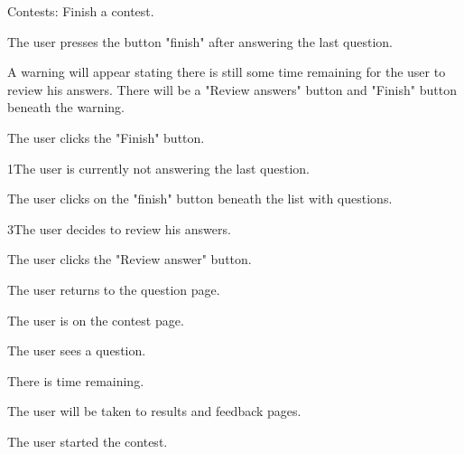 \documentclass[10pt,a4paper]{article}
\begin{document}
\begin{uc}{Contests: Finish a contest.}


    \begin{uc-mss}
    \item The user presses the button "finish" after answering the last question.
    \item A warning will appear stating there is still some time remaining for the user to review his answers. There will be a "Review answers" button and "Finish" button beneath the warning.
    \item The user clicks the "Finish" button.
    \end{uc-mss}

    \begin{uc-ext}

        \begin{uc-fail}{1}{The user is currently not answering the last question.}
        \item The user clicks on the "finish" button beneath the list with questions. 
        \end{uc-fail}

	\begin{uc-fail}{3}{The user decides to review his answers.}
	\item The user clicks the "Review answer" button.
	\item The user returns to the question page. 
	\end{uc-fail}

    \end{uc-ext}

    \begin{uc-pre}
    \item The user is on the contest page.
    \item The user sees a question. 
    \item There is time remaining. 
    \end{uc-pre}

    \begin{uc-post}
    \item The user will be taken to results and feedback pages. 
    \end{uc-post}

    \begin{uc-trig}
    The user started the contest. 
    \end{uc-trig}

\end{uc}
\end{document}
